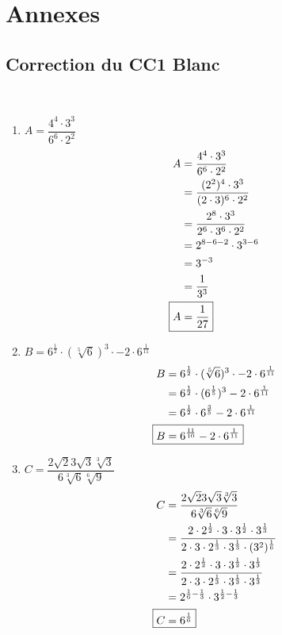 \chapter{Annexes}
\section{Correction du CC1 Blanc}
\begin{exercice}~
    \begin{enumerate}
    \item $A = \dfrac{4^4 \cdot 3^3}{6^6 \cdot 2^2}$
    \begin{align*}
        A &= \frac{4^4 \cdot 3^3}{6^6 \cdot 2^2} \\
          &= \frac{(2^2)^4 \cdot 3^3}{(2 \cdot 3)^6 \cdot 2^2} \\
          &= \frac{2^8 \cdot 3^3}{2^6 \cdot 3^6 \cdot 2^2} \\
          &= 2^{8 - 6 - 2} \cdot 3^{3-6} \\
          &= 3^{-3} \\
          &= \frac{1}{3^3} \\
          \Aboxed{A &= \frac{1}{27}}
    \end{align*}
    \item $B = 6^{\frac{1}{2}} \cdot (\sqrt[5]{6})^3 \cdot - 2 \cdot 6^{\frac{1}{11}}$
    \begin{align*}
        B &= 6^{\frac{1}{2}} \cdot (\sqrt[5]{6})^3 \cdot - 2 \cdot 6^{\frac{1}{11}} \\
          &= 6^{\frac{1}{2}} \cdot (6^{\frac{1}{5}})^3 - 2 \cdot 6^{\frac{1}{11}} \\
          &= 6^{\frac{1}{2}} \cdot 6^{\frac{3}{5}} - 2 \cdot 6^{\frac{1}{11}} \\
        \Aboxed{B &= 6^{\frac{11}{10}} - 2 \cdot 6^{\frac{1}{11}} }
    \end{align*}
    \item $C = \dfrac{ 2\sqrt{2} 3\sqrt{3} \sqrt[3]{3} }{ 6 \sqrt[3]{6} \sqrt[6]{9} }$
    \begin{align*}
        C &= \dfrac{ 2\sqrt{2} 3\sqrt{3} \sqrt[3]{3} }{ 6 \sqrt[3]{6} \sqrt[6]{9} } \\
          &= \frac{2 \cdot 2^{\frac{1}{2}} \cdot  3 \cdot 3^{\frac{1}{2}} \cdot 3^{\frac{1}{3} }}{2 \cdot 3 \cdot 2^{\frac{1}{3}} \cdot 3^{\frac{1}{3}} \cdot (3^2)^{\frac{1}{6} } } \\
          &= \frac{ 2 \cdot 2^{ \frac{1}{2} } \cdot 3 \cdot 3^{ \frac{1}{2} } \cdot 3^{ \frac{1}{3} } }{ 2 \cdot 3 \cdot 2^{ \frac{1}{3} } \cdot 3^{ \frac{1}{3} } \cdot 3^{ \frac{1}{3} } } \\
          &= 2^{\frac{1}{6} - \frac{1}{3}} \cdot 3^{\frac{1}{2} - \frac{1}{3} } \\
        \Aboxed{C &= 6^{\frac{1}{6}}}
    \end{align*}
\end{enumerate}
\end{exercice}

